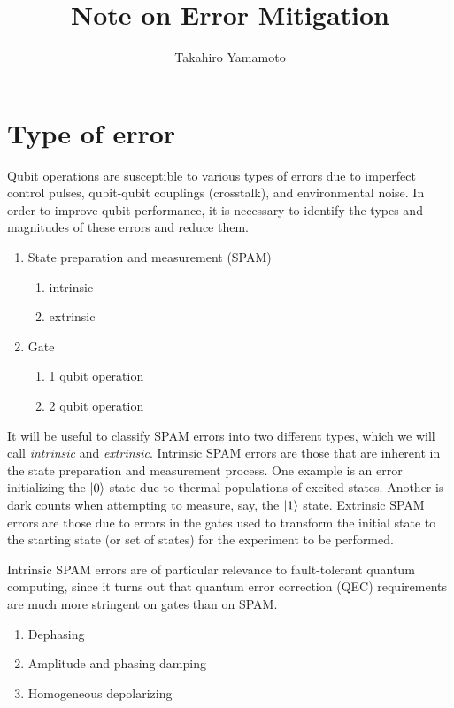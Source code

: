 \documentclass[11pt, oneside]{article}   	%
\title{Note on Error Mitigation}
\author{Takahiro Yamamoto}
\begin{document}
\maketitle
\section{Type of error}
Qubit operations are susceptible to various types of errors due to imperfect control pulses, qubit-qubit couplings (crosstalk), and environmental noise. In order to improve qubit performance, it is necessary to identify the types and magnitudes of these errors and reduce them.
\begin{enumerate}
\item State preparation and measurement (SPAM)
\begin{enumerate}
\item intrinsic
\item extrinsic
\end{enumerate}
\item Gate
\begin{enumerate}
\item {1 qubit operation}
\item {2 qubit operation}
\end{enumerate}
\end{enumerate}

It will be useful to classify SPAM errors into two different types, which we will call {\em intrinsic} and {\em extrinsic}. 
Intrinsic SPAM errors are those that are inherent in the state preparation and measurement process. 
One example is an error initializing the $\ket{0}$ state due to thermal populations of excited states. 
Another is dark counts when attempting to measure, say, the $\ket{1}$ state. 
Extrinsic SPAM errors are those due to errors in the gates used to transform the initial state to the starting state (or set of states) for the experiment to be performed. 

Intrinsic SPAM errors are of particular relevance to fault-tolerant quantum computing, since it turns out that quantum error correction (QEC) requirements are much more stringent on gates than on SPAM. 

\begin{enumerate}
\item Dephasing
\item Amplitude and phasing damping
\item Homogeneous depolarizing
\end{enumerate}
\end{document}
